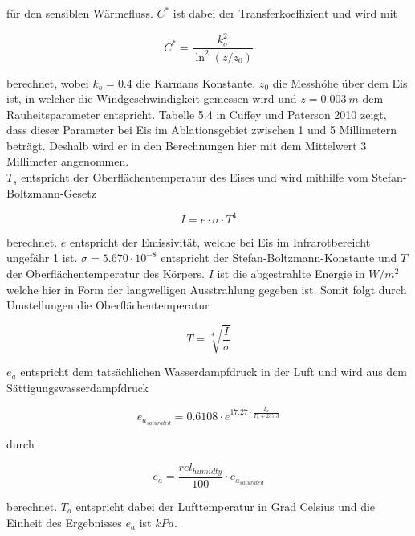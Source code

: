 \documentclass[12pt,a4paper]{article}
\begin{document}
für den sensiblen Wärmefluss. $C^*$ ist dabei der Transferkoeffizient und wird mit 

\begin{equation}\label{eq:Transferkoeffizient}
C^{*}=\frac{k_{o}^{2}}{\ln ^{2}\left(z / z_{0}\right)}
\end{equation}

berechnet, wobei $k_{o}=0.4$ die Karmans Konstante, $z_{0}$ die Messhöhe über dem Eis ist, in welcher die Windgeschwindigkeit gemessen wird und $z=0.003~m$ dem Rauheitsparameter entspricht. Tabelle 5.4 in Cuffey und Paterson 2010 zeigt, dass dieser Parameter bei Eis im Ablationsgebiet zwischen 1 und 5 Millimetern beträgt. Deshalb wird er in den Berechnungen hier mit dem Mittelwert 3 Millimeter angenommen.\\ %

$T_s$ entspricht der Oberflächentemperatur des Eises und wird mithilfe vom Stefan-Boltzmann-Gesetz 

\begin{equation}\label{eq:Boltzmann-Gesetz}
I = e \cdot \sigma \cdot T^4
\end{equation}

berechnet. $e$ entspricht der Emissivität, welche bei Eis im Infrarotbereicht ungefähr 1 ist. $\sigma=5.670 \cdot 10^{-8}$ entspricht der Stefan-Boltzmann-Konstante und $T$ der Oberflächentemperatur des Körpers. $I$ ist die abgestrahlte Energie in $W/m^2$ welche hier in Form der langwelligen Ausstrahlung gegeben ist. Somit folgt durch Umstellungen die Oberflächentemperatur

\begin{equation}\label{eq:Oberflächentemperatur}
T = \sqrt[4]{\frac{I}{\sigma}}
\end{equation}


$e_a$ entspricht dem tatsächlichen Wasserdampfdruck in der Luft und wird aus dem Sättigungswasserdampfdruck


\begin{equation}
e_{a_{saturated}}=0.6108 \cdot e^{17.27 \cdot \frac{T_a}{T_a + 237.3}}
\end{equation}

durch

\begin{equation}
e_a = \frac{rel_{humidty}}{100} \cdot e_{a_{saturated}}
\end{equation}

berechnet. $T_a$ entspricht dabei der Lufttemperatur in Grad Celsius und die Einheit des Ergebnisses $e_a$ ist $kPa$.\\
\end{document}
